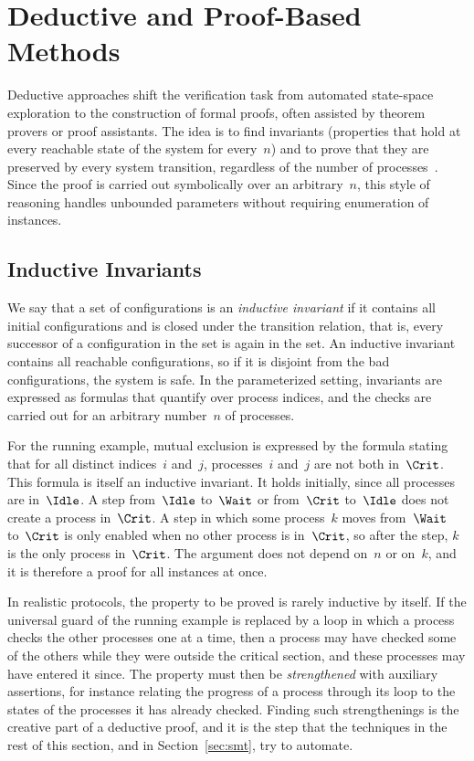 \section{Deductive and Proof-Based Methods}
\label{sec:deductive}

Deductive approaches shift the verification task from automated state-space
exploration to the construction of formal proofs, often assisted by theorem
provers or proof assistants. The idea is to find invariants (properties
that hold at every reachable state of the system for every~$n$) and to prove
that they are preserved by every system transition, regardless of the number
of processes~\cite{OG76,Lam94}. Since the proof is carried out symbolically
over an arbitrary~$n$, this style of reasoning handles unbounded parameters
without requiring enumeration of instances.

\subsection{Inductive Invariants}

We say that a set of configurations is an \emph{inductive invariant} if it
contains all initial configurations and is closed under the transition
relation, that is, every successor of a configuration in the set is again in
the set. An inductive invariant contains all reachable configurations, so if
it is disjoint from the bad configurations, the system is safe. In the
parameterized setting, invariants are expressed as formulas that quantify
over process indices, and the checks are carried out for an arbitrary
number~$n$ of processes.

For the running example, mutual exclusion is expressed by the formula stating
that for all distinct indices~$i$ and~$j$, processes~$i$ and~$j$ are not both
in~$\Crit$. This formula is itself an inductive invariant. It holds initially,
since all processes are in~$\Idle$. A step from~$\Idle$ to~$\Wait$ or
from~$\Crit$ to~$\Idle$ does not create a process in~$\Crit$. A step in which
some process~$k$ moves from~$\Wait$ to~$\Crit$ is only enabled when no other
process is in~$\Crit$, so after the step, $k$ is the only process in~$\Crit$.
The argument does not depend on~$n$ or on~$k$, and it is therefore a proof for
all instances at once.

In realistic protocols, the property to be proved is rarely inductive by
itself. If the universal guard of the running example is replaced by a loop in
which a process checks the other processes one at a time, then a process may
have checked some of the others while they were outside the critical section,
and these processes may have entered it since. The property must then be
\emph{strengthened} with auxiliary assertions, for instance relating the
progress of a process through its loop to the states of the processes it has
already checked. Finding such strengthenings is the creative part of a
deductive proof, and it is the step that the techniques in the rest of this
section, and in Section~\ref{sec:smt}, try to automate.

